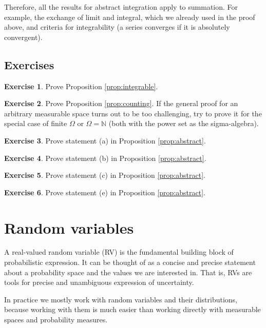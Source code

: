 \documentclass{book}
\theoremstyle{plain}%
\theoremstyle{definition}
\newtheorem{exercise}{Exercise}[chapter]
\begin{document}
Therefore, all the results for abstract integration apply to summation. For example, the exchange of limit and integral, which we already used in the proof above, and criteria for integrability (a series converges if it is absolutely convergent).

\section*{Exercises}

\begin{exercise}
Prove Proposition \ref{prop:integrable}.
\end{exercise}

\begin{exercise}
Prove Proposition \ref{prop:counting}. If the general proof for an arbitrary measurable space turns out to be too challenging, try to prove it for the special case of finite $\Omega$ or $\Omega = \mathbb{N}$ (both with the power set as the sigma-algebra).
\end{exercise}


\begin{exercise}
Prove statement (a) in Proposition \ref{prop:abstract}.
\end{exercise}

\begin{exercise}
Prove statement (b) in Proposition \ref{prop:abstract}.
\end{exercise}

\begin{exercise}
Prove statement (c) in Proposition \ref{prop:abstract}.
\end{exercise}

\begin{exercise}
Prove statement (e) in Proposition \ref{prop:abstract}.
\end{exercise}


\chapter{Random variables}\label{ch:rvs}

A real-valued random variable (RV) is the fundamental building block of probabilistic expression. It can be thought of as a concise and precise statement about a probability space and the values we are interested in. That is, RVs are tools for precise and unambiguous expression of uncertainty.

In practice we mostly work with random variables and their distributions, because working with them is much easier than working directly with measurable spaces and probability measures.
\end{document}
